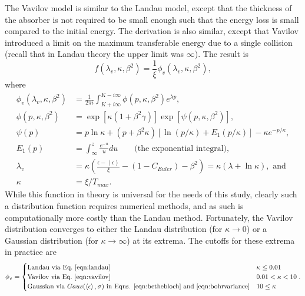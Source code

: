 \label{sec:ICOOLVavilov}
The Vavilov model \cite{vavilov} is similar to the Landau model, except that the thickness of the absorber is not required to be small enough such that the energy loss is small compared to the initial energy. The derivation is also similar, except that Vavilov introduced a limit on the maximum transferable energy due to a single collision (recall that in Landau theory the upper limit was $\infty$). The result is
\begin{equation}\label{eqn:vavilov}
f(\lambda_v, \kappa, \beta^2)=\frac{1}{\xi}\phi_v (\lambda_v , \kappa, \beta^2),
\end{equation}
where
\begin{align*}
\phi_v (\lambda_v,\kappa,\beta^2)&=\frac{1}{2\pi i}\int_{K+i\infty} ^{K-i\infty} \phi(p,\kappa,\beta^2) e^{\lambda p},\\
\phi(p,\kappa,\beta^2)&=\exp[\kappa(1+\beta^2 \gamma)]\exp[\psi(p,\kappa,\beta^2)],\\
\psi(p)&=p\ln \kappa + (p+\beta^2\kappa)[\ln(p/\kappa)+E_1 (p/\kappa)]-\kappa e^{-p/\kappa},\\
E_1 (p)&= \int_\infty ^z \frac{e^{-u}}{u} du \qquad \text{(the exponential integral)},\\
\lambda_v &= \kappa\left(\frac{\epsilon-\left<\epsilon\right>}{\xi}-(1-C_{Euler})-\beta^2\right)= \kappa(\lambda+\ln\kappa),\text{ and}\\
\kappa&=\xi/T_{max}.
\end{align*}
While this function in theory is universal for the needs of this study, clearly such a distribution function requires numerical methods, and as such is computationally more costly than the Landau method. Fortunately, the Vavilov distribution converges to either the Landau distribution (for $\kappa\rightarrow 0$) or a Gaussian distribution (for $\kappa\rightarrow\infty$) at its extrema. The cutoffs for these extrema in practice are
\begin{align*}
\phi_v=
	\begin{cases}
	\text{Landau via Eq.~\eqref{eqn:landau}} & \kappa\leq 0.01\\
	\text{Vavilov via Eq.~\eqref{eqn:vavilov}} & 0.01 < \kappa < 10\\
	\text{Gaussian via }Gaus(\left<\epsilon\right>,\sigma)\text{ in Eqns. \ref{eqn:bethebloch} and \ref{eqn:bohrvariance}} & 10\leq\kappa
	\end{cases}.
\end{align*}

